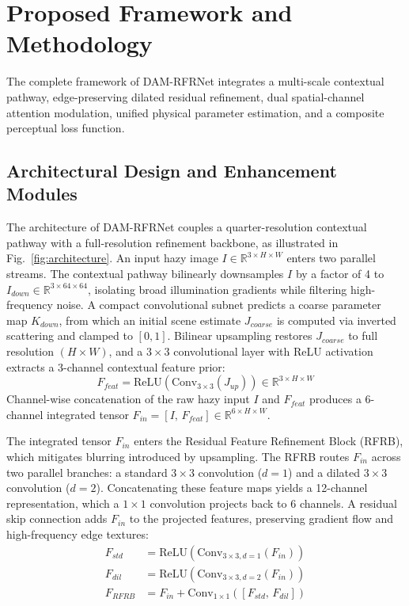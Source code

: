 \documentclass[journal]{IEEEtran}
\begin{document}
\section{Proposed Framework and Methodology}
The complete framework of DAM-RFRNet integrates a multi-scale contextual pathway, edge-preserving dilated residual refinement, dual spatial-channel attention modulation, unified physical parameter estimation, and a composite perceptual loss function.

\subsection{Architectural Design and Enhancement Modules}
The architecture of DAM-RFRNet couples a quarter-resolution contextual pathway with a full-resolution refinement backbone, as illustrated in Fig.~\ref{fig:architecture}. An input hazy image $I \in \mathbb{R}^{3 \times H \times W}$ enters two parallel streams. The contextual pathway bilinearly downsamples $I$ by a factor of 4 to $I_{down} \in \mathbb{R}^{3 \times 64 \times 64}$, isolating broad illumination gradients while filtering high-frequency noise. A compact convolutional subnet predicts a coarse parameter map $K_{down}$, from which an initial scene estimate $J_{coarse}$ is computed via inverted scattering and clamped to $[0, 1]$. Bilinear upsampling restores $J_{coarse}$ to full resolution $(H \times W)$, and a $3 \times 3$ convolutional layer with ReLU activation extracts a 3-channel contextual feature prior:
\begin{equation}
F_{feat} = \text{ReLU}(\text{Conv}_{3\times3}(J_{up})) \in \mathbb{R}^{3 \times H \times W}
\end{equation}
Channel-wise concatenation of the raw hazy input $I$ and $F_{feat}$ produces a 6-channel integrated tensor $F_{in} = [I, \, F_{feat}] \in \mathbb{R}^{6 \times H \times W}$.

The integrated tensor $F_{in}$ enters the Residual Feature Refinement Block (RFRB), which mitigates blurring introduced by upsampling. The RFRB routes $F_{in}$ across two parallel branches: a standard $3 \times 3$ convolution ($d=1$) and a dilated $3 \times 3$ convolution ($d=2$). Concatenating these feature maps yields a 12-channel representation, which a $1 \times 1$ convolution projects back to 6 channels. A residual skip connection adds $F_{in}$ to the projected features, preserving gradient flow and high-frequency edge textures:
\begin{align}
F_{std} &= \text{ReLU}(\text{Conv}_{3\times3, d=1}(F_{in})) \\
F_{dil} &= \text{ReLU}(\text{Conv}_{3\times3, d=2}(F_{in})) \\
F_{RFRB} &= F_{in} + \text{Conv}_{1\times1}([F_{std}, \, F_{dil}])
\end{align}
\end{document}
